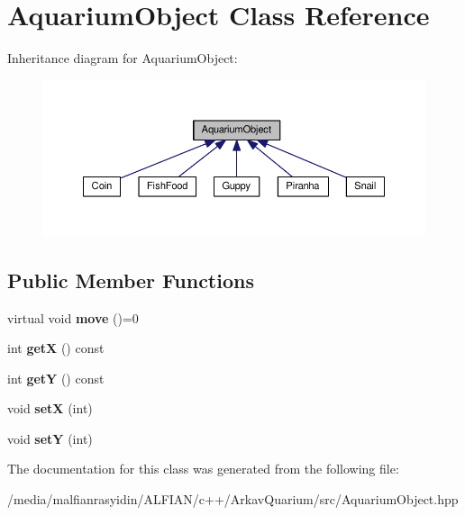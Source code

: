 \hypertarget{class_aquarium_object}{}\section{Aquarium\+Object Class Reference}
\label{class_aquarium_object}


Inheritance diagram for Aquarium\+Object\+:
\nopagebreak
\begin{figure}[H]
\begin{center}
\leavevmode
\includegraphics[width=350pt]{class_aquarium_object__inherit__graph}
\end{center}
\end{figure}
\subsection*{Public Member Functions}
\begin{DoxyCompactItemize}
\item 
\mbox{\label{class_aquarium_object_a42c4de640f89ac8aebc26b7618578575}} 
virtual void {\bfseries move} ()=0
\item 
\mbox{\label{class_aquarium_object_a1dd18ba4c21c8fb1c0796791f527a257}} 
int {\bfseries getX} () const
\item 
\mbox{\label{class_aquarium_object_a53eadc1189fa466e61b5f6b2b597de4b}} 
int {\bfseries getY} () const
\item 
\mbox{\label{class_aquarium_object_a650f8f46f51ca64889fd3e1455f9696c}} 
void {\bfseries setX} (int)
\item 
\mbox{\label{class_aquarium_object_aa2ee76b48d56edf3b4cc5bcd199f8efe}} 
void {\bfseries setY} (int)
\end{DoxyCompactItemize}


The documentation for this class was generated from the following file\+:\begin{DoxyCompactItemize}
\item 
/media/malfianrasyidin/\+A\+L\+F\+I\+A\+N/c++/\+Arkav\+Quarium/src/Aquarium\+Object.\+hpp\end{DoxyCompactItemize}
